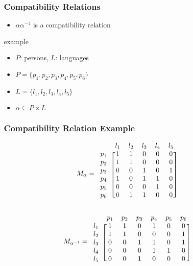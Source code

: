 \documentclass[dvipsnames]{beamer}
\begin{document}
\begin{frame}
  \frametitle{Compatibility Relations}

  \begin{itemize}
    \item $\alpha \alpha^{-1}$ is a compatibility relation
  \end{itemize}

  \begin{exampleblock}{example}
    \begin{itemize}
     \item $P$: persons, $L$: languages
     \item $P=\{p_1,p_2,p_3,p_4,p_5,p_6\}$
     \item $L=\{l_1,l_2,l_3,l_4,l_5\}$
     \item $\alpha \subseteq P \times L$
    \end{itemize}
  \end{exampleblock}
\end{frame}

\begin{frame}
  \frametitle{Compatibility Relation Example}

  \[
    M_\alpha =
      \begin{blockarray}{cccccc}
              & l_1 & l_2 & l_3 & l_4 & l_5\\
        \begin{block}{c[ccccc]}
          p_1 &  1  &  1  &  0  &  0  &  0\\
          p_2 &  1  &  1  &  0  &  0  &  0\\
          p_3 &  0  &  0  &  1  &  0  &  1\\
          p_4 &  1  &  0  &  1  &  1  &  0\\
          p_5 &  0  &  0  &  0  &  1  &  0\\
          p_6 &  0  &  1  &  1  &  0  &  0\\
        \end{block}
      \end{blockarray}
  \]

  \[
    M_{\alpha^{-1}} =
      \begin{blockarray}{ccccccc}
              & p_1 & p_2 & p_3 & p_4 & p_5 & p_6\\
        \begin{block}{c[cccccc]}
          l_1 &  1  &  1  &  0  &  1  &  0  &  0\\
          l_2 &  1  &  1  &  0  &  0  &  0  &  1\\
          l_3 &  0  &  0  &  1  &  1  &  0  &  1\\
          l_4 &  0  &  0  &  0  &  1  &  1  &  0\\
          l_5 &  0  &  0  &  1  &  0  &  0  &  0\\
        \end{block}
      \end{blockarray}
  \]
\end{frame}
\end{document}
